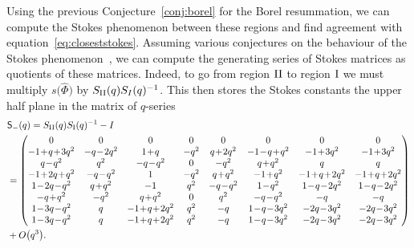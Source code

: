 \documentclass[pdftex]{sigma}
\numberwithin{equation}{section}
\begin{document}
Using the previous Conjecture~\ref{conj:borel} for the Borel resummation, we can compute the Stokes phenomenon between these regions and find agreement with equation~\eqref{eq:closeststokes}. Assuming various conjectures on the behaviour of the Stokes phenomenon~\cite{GGM:I}, we can compute the generating series of Stokes matrices as quotients of these matrices. Indeed, to go from region $\rm II$ to region $\rm I$ we must multiply $s\bigl(\widehat{\Phi}\bigr)$ by $S_{\rm II}(q)S_{I}(q)^{-1}$. This then stores the Stokes constants the upper half plane in the matrix of $q$-series{\setlength{\arraycolsep}{1.5pt}
\begin{align*}
 &\mathsf{S}_{-}(q) =S_{\rm II}(q)S_{\rm I}(q)^{-1}-I\\
 &
 =\begin{pmatrix}
 0 & 0 & 0 & 0 & 0 & 0 & 0 & 0\\
 -1\!+\!q\!+\!3q^2 & -q\!-\!2q^2 & 1\!+\!q & -q^2 & q\!+\!2q^2 & -1\!-\!q\!+\!q^2 & -1\!+\!3q^2 & -1\!+\!3q^2 \\
 q\!-\!q^2 & q^2 & -q\!-\!q^2 & 0 & -q^2 & q\!+\!q^2 & q & q \\
 -1\!+\!2q\!+\!q^2 & -q\!-\!q^2 & 1 & -q^2 & q\!+\!q^2 & -1\!+\!q^2 & -1\!+\!q\!+\!2q^2 & -1\!+\!q\!+\!2q^2 \\
 1\!-\!2q\!-\!q^2 & q\!+\!q^2 & -1 & q^2 & -q\!-\!q^2 & 1\!-\!q^2 & 1\!-\!q\!-\!2q^2 & 1\!-\!q\!-\!2q^2 \\
 -q\!+\!q^2 & -q^2 & q\!+\!q^2 & 0 & q^2 & -q\!-\!q^2 & -q & -q \\
 1\!-\!3q\!-\!q^2 & q & -1\!+\!q\!+\!2q^2 & q^2 & -q & 1\!-\!q\!-\!3q^2 & -2q\!-\!3q^2 & -2q\!-\!3q^2 \\
 1\!-\!3q\!-\!q^2 & q & -1\!+\!q\!+\!2q^2 & q^2 & -q & 1\!-\!q\!-\!3q^2 & -2q\!-\!3q^2 & -2q\!-\!3q^2
\end{pmatrix}\\
&+O\bigl(q^3\bigr).
\end{align*}}%
\end{document}
